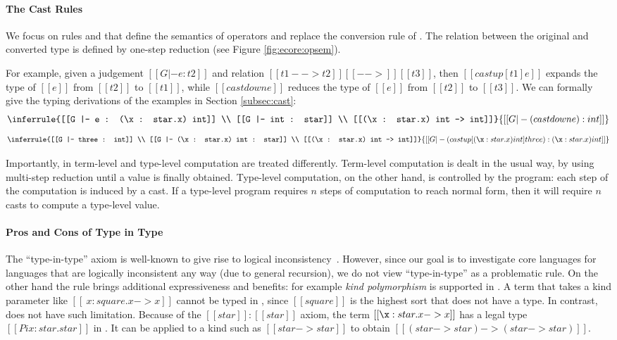 \paragraph{The Cast Rules}
We focus on rules  and  that
define the semantics of \cast operators and replace the conversion
rule of \cc. The relation between the original
and converted type is defined by one-step reduction (see Figure
\ref{fig:ecore:opsem}). 

For example, given a judgement
$[[G |- e : t2]]$ and relation $[[t1 --> t2]] [[-->]] [[t3]]$, then
$[[castup [t1] e]]$ expands the type of $[[e]]$ from $[[t2]]$ to
$[[t1]]$, while $[[castdown e]]$ reduces the type of $[[e]]$ from
$[[t2]]$ to $[[t3]]$. We can formally give the typing derivations of 
the examples in Section \ref{subsec:cast}:
\[
\inferrule{[[G |- e : (\x : star.x) int]] \\ [[G |- int : star]] \\ [[(\x :
star.x) int --> int]]}{[[G |- (castdown e):int]]}
\]
\[
\inferrule{[[G |- three : int]] \\ [[G |- (\x : star.x) int : star]] \\ [[(\x :
star.x) int --> int]]}{[[G |- (castup[(\x : star.x) int] three):(\x : star.x)
int]]}
\]

Importantly, in \ecore term-level and type-level computation are treated 
differently. Term-level computation is dealt in the usual way, by 
using multi-step reduction until a value is finally obtained. 
Type-level computation, on the other hand, is controlled by the program:
each step of the computation is induced by a cast. If a type-level 
program requires $n$ steps of computation to reach normal form, 
then it will require $n$ casts to compute a type-level value.

\paragraph{Pros and Cons of Type in Type}
The ``type-in-type'' axiom is well-known to give rise 
to logical inconsistency~\cite{systemfw}. However, since our goal is to 
investigate core languages for languages that are logically
inconsistent any way (due to general recursion), we do not view 
``type-in-type''  as a problematic rule.
On the other hand the rule  brings additional
expressiveness and benefits:
for example \emph{kind polymorphism} is supported in \ecore.
A term that takes a kind parameter like $[[\
    x:square.x->x]]$ cannot be typed in \cc, since $[[square]]$ is
the highest sort that does not have a type.
In contrast, \ecore does not have such limitation. Because of
the $[[star]]:[[star]]$ axiom, the term $[[\x:star.x->x]]$ has a legal 
type $[[Pi x:star.star]]$ in \ecore. It can be applied to 
a kind such as $[[star -> star]]$
to obtain $[[(star->star) -> (star -> star)]]$.

